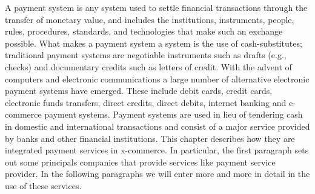 A payment system is any system used to settle financial transactions through the transfer of monetary value, and includes the institutions, instruments, people, rules, procedures, standards, and technologies that make such an exchange possible.
\newline
What makes a payment system a system is the use of cash-substitutes; traditional payment systems are negotiable instruments such as drafts (e.g., checks) and documentary credits such as letters of credit. With the advent of computers and electronic communications a large number of alternative electronic payment systems have emerged. These include debit cards, credit cards, electronic funds transfers, direct credits, direct debits, internet banking and e-commerce payment systems.
\newline
Payment systems are used in lieu of tendering cash in domestic and international transactions and consist of a major service provided by banks and other financial institutions.
\newline
This chapter describes how they are integrated payment services in x-commerce. In particular, the first paragraph sets out some principals companies that provide services like payment service provider. In the following paragraphs we will enter more and more in detail in the use of these services.